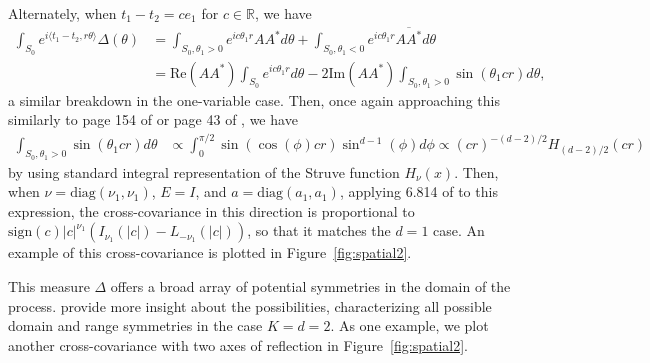 \documentclass[11pt]{article}
\begin{document}
Alternately, when $t_1 - t_2 = ce_1$ for $c \in \mathbb{R}$, we have \begin{align*}
\int_{S_0} e^{i\langle t_1 - t_2, r\theta\rangle}\Delta(\theta)&= \int_{S_0, \theta_1 > 0}e^{ic\theta_1r}AA^* d\theta +  \int_{S_0, \theta_1 < 0}e^{ic\theta_1r}\overline{AA^*} d\theta \\
&=\textrm{Re}(AA^*)\int_{S_0}e^{ic\theta_1r} d\theta -2\textrm{Im}(AA^*) \int_{S_0, \theta_1 > 0}\sin(\theta_1 cr)d\theta, 
\end{align*}a similar breakdown in the one-variable case. 
Then, once again approaching this similarly to page 154 of \cite{stein_introduction_1975} or page 43 of \cite{stein_interpolation_2013}, we have \begin{align*}
\int_{S_0, \theta_1 > 0}\sin(\theta_1 cr)d\theta &\propto \int_0^{\pi/2}\sin(\cos(\phi) cr) \sin^{d-1}(\phi)d\phi\propto(cr)^{-(d-2)/2} H_{(d-2)/2}(cr)
\end{align*}by using standard integral representation of the Struve function $H_\nu(x)$.
Then, when $\nu = \textrm{diag}(\nu_1, \nu_1)$, $E = I$, and $a =  \textrm{diag}(a_1, a_1)$,
applying 6.814 of \cite{noauthor_table_2015} to this expression, the cross-covariance in this direction is proportional to $\textrm{sign}(c)|c|^{\nu_1} \left(I_{\nu_1}(|c|) - L_{-\nu_1}(|c|)\right)$, so that it matches the $d=1$ case.
An example of this cross-covariance is plotted in Figure~\ref{fig:spatial2}.

This measure $\Delta$ offers a broad array of potential symmetries in the domain of the process. \cite{didier_domain_2018} provide more insight about the possibilities, characterizing all possible domain and range symmetries in the case $K = d = 2$. 
As one example, we plot another cross-covariance with two axes of reflection in Figure~\ref{fig:spatial2}.
\end{document}
